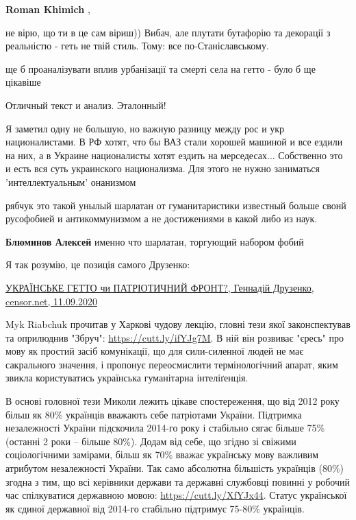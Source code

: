 \begin{itemize}
\begin{itemize}
\textbf{Roman Khimich} , 

не вірю, що ти в це сам віриш)) Вибач, але плутати бутафорію та декорації з
реальністю - геть не твій стиль. Тому: все по-Станіславському.

\end{itemize} %

ще б проаналізувати вплив урбанізації та смерті села на гетто - було б ще цікавіше

Отличный текст и анализ. Эталонный!


Я заметил одну не большую, но важную разницу между рос и укр националистами. В
РФ хотят, что бы ВАЗ стали хорошей машиной и все ездили на них, а в Украине
националисты хотят ездить на мерседесах... Собственно это и есть вся суть
украинского национализма. Для этого не нужно заниматься 'интеллектуальным'
онанизмом



рябчук это такой унылый шарлатан от гуманитаристики известный больше свонй
русофобией и антикоммунизмом а не достижениями в какой либо из наук.

\textbf{Блюминов Алексей} именно что шарлатан, торгующий набором фобий

Я так розумію, це позиція самого Друзенко:

\href{https://censor.net/ru/blogs/3218760/ukranske_getto_chi_patrotichniyi_front}{%
УКРАЇНСЬКЕ ГЕТТО чи ПАТРІОТИЧНИЙ ФРОНТ?, Геннадій Друзенко, censor.net, 11.09.2020%
}

\begin{multicols}{2}

Myk Riabchuk прочитав у Харкові чудову лекцію, гловні тези якої законспектував
та оприлюднив "Збруч": \url{https://cutt.ly/ifYJg7M}. В ній він розвиває "єресь" про
мову як простий засіб комунікації, що для сили-силенної людей не має
сакрального значення, і пропонує переосмислити термінологічний апарат, яким
звикла користуватись українська гуманітарна інтеліґенція.

В основі головної тези Миколи лежить цікаве спостереження, що від 2012 року
більш як 80\% українців вважають себе патріотами України. Підтримка незалежності
України підскочила 2014-го року і стабільно сягає більше 75\% (останні 2 роки –
більше 80\%). Додам від себе, що згідно зі свіжими соціологічними замірами,
більш як 70\% вважає українську мову важливим атрибутом незалежності України.
Так само абсолютна більшість українців (80\%) згодна з тим, що всі керівники
держави та державні службовці повинні у робочий час спілкуватися державною
мовою: \url{https://cutt.ly/XfYJx44}. Статус української як єдиної державної від
2014-го стабільно підтримує 75-80\% українців.


\end{multicols}
\end{itemize}
